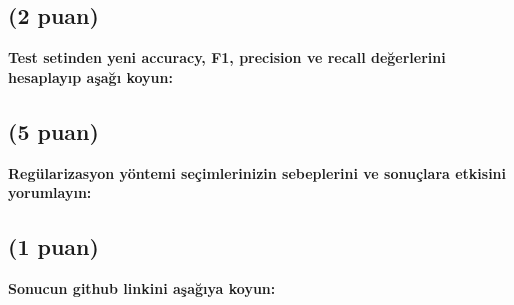 \documentclass[11pt]{article}
\begin{document}
\subsection{(2 puan)} \textbf{Test setinden yeni accuracy, F1, precision ve recall değerlerini hesaplayıp aşağı koyun:}



\subsection{(5 puan)} \textbf{Regülarizasyon yöntemi seçimlerinizin sebeplerini ve sonuçlara etkisini yorumlayın:}



\subsection{(1 puan)} \textbf{Sonucun github linkini  aşağıya koyun:}

\url{}
\end{document}
